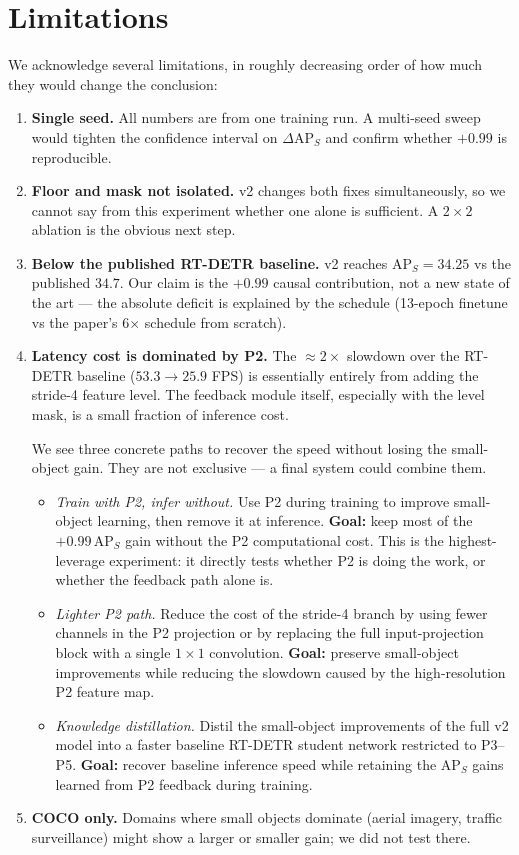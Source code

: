 \section{Limitations}
\label{sec:limitations}

We acknowledge several limitations, in roughly decreasing order of how much they would change the conclusion:

\begin{enumerate}
    \item \textbf{Single seed.} All numbers are from one training run. A multi-seed sweep would tighten the confidence interval on $\Delta\mathrm{AP}_S$ and confirm whether $+0.99$ is reproducible.
    \item \textbf{Floor and mask not isolated.} v2 changes both fixes simultaneously, so we cannot say from this experiment whether one alone is sufficient. A $2{\times}2$ ablation is the obvious next step.
    \item \textbf{Below the published RT-DETR baseline.} v2 reaches $\mathrm{AP}_S = 34.25$ vs the published $34.7$. Our claim is the $+0.99$ causal contribution, not a new state of the art --- the absolute deficit is explained by the schedule (13-epoch finetune vs the paper's 6$\times$ schedule from scratch).
    \item \textbf{Latency cost is dominated by P2.} The ${\approx}2{\times}$ slowdown over the RT-DETR baseline ($53.3 \to 25.9$ FPS) is essentially entirely from adding the stride-4 feature level. The feedback module itself, especially with the level mask, is a small fraction of inference cost.

    We see three concrete paths to recover the speed without losing the small-object gain. They are not exclusive --- a final system could combine them.

    \begin{itemize}
        \item[(i)] \emph{Train with P2, infer without.} Use P2 during training to improve small-object learning, then remove it at inference. \textbf{Goal:} keep most of the $+0.99$\,$\mathrm{AP}_S$ gain without the P2 computational cost. This is the highest-leverage experiment: it directly tests whether P2 is doing the work, or whether the feedback path alone is.
        \item[(ii)] \emph{Lighter P2 path.} Reduce the cost of the stride-4 branch by using fewer channels in the P2 projection or by replacing the full input-projection block with a single $1{\times}1$ convolution. \textbf{Goal:} preserve small-object improvements while reducing the slowdown caused by the high-resolution P2 feature map.
        \item[(iii)] \emph{Knowledge distillation.} Distil the small-object improvements of the full v2 model into a faster baseline RT-DETR student network restricted to P3--P5. \textbf{Goal:} recover baseline inference speed while retaining the $\mathrm{AP}_S$ gains learned from P2 feedback during training.
    \end{itemize}
    \item \textbf{COCO only.} Domains where small objects dominate (aerial imagery, traffic surveillance) might show a larger or smaller gain; we did not test there.
\end{enumerate}
